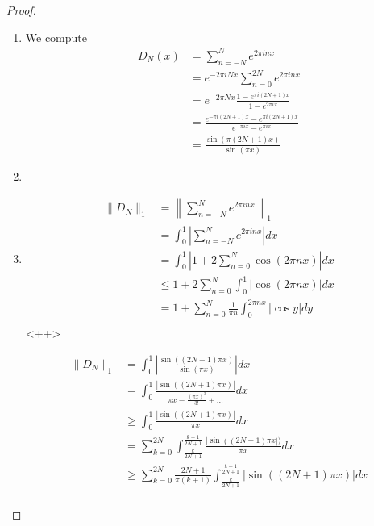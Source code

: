 \documentclass[a4paper]{article}
\begin{document}
\begin{enumerate}
\begin{proof}
  \begin{enumerate}
    \item
      We compute
      \begin{align*}
        D_N(x) &= \sum_{n=-N}^N e^{2 \pi i n x} \\
        &= e^{-2 \pi i N x} \sum_{n=0}^{2N} e^{2 \pi i n x} \\
        &= e^{-2 \pi N x} \frac{1 - e^{\pi i (2N+1)x}}{1 - e^{2 \pi i x}} \\
        &= \frac{e^{-\pi i (2N+1)x} - e^{\pi i (2N+1) x}}{ e^{-\pi i x} - e^{ \pi i x}} \\
        &= \frac{\sin \left( \pi (2N+1)x \right)}{\sin \left( \pi x \right)}
      \end{align*}

    \item

    \item
      \begin{align*}
        \| D_N \|_1 &= \left\| \sum_{n = -N}^N e^{2 \pi i n x} \right\|_1 \\
        &= \int_{0}^{1} \left| \sum_{n=-N}^N e^{2 \pi i n x} \right| dx \\
        &= \int_{0}^{1} \left| 1 + 2 \sum_{n = 0}^N \cos( 2 \pi n x) \right| dx \\
        &\leq 1 + 2 \sum_{n = 0}^N \int_{0}^{1} \left| \cos(2 \pi n x) \right| dx \\
        &= 1 + \sum_{n=0}^N \frac{1}{\pi n} \int_{0}^{2 \pi n x} | \cos y | dy \\
      \end{align*}<++>

      \begin{align*}
        \| D_N \|_1 &= \int_{0}^{1} \left| \frac{\sin \left( (2N+1) \pi x \right)}{\sin (\pi x)} \right| dx \\
        &= \int_{0}^{1} \frac{ | \sin \left( ( 2N+1 ) \pi x \right) |}{ \pi x - \frac{(\pi x)^3}{3!} + \dots} dx \\
        &\geq \int_{0}^{1} \frac{| \sin \left( ( 2N+1 ) \pi x \right) |}{\pi x} dx \\
        &= \sum_{k=0}^{2N} \int_{\frac{k}{2N+1}}^{\frac{k+1}{2N+1}} \frac{| \sin \left( ( 2N+1 ) \pi x \right |)}{\pi x} dx \\
        &\geq \sum_{k = 0}^{2N} \frac{2N+1}{\pi (k+1)} \int_{\frac{k}{2N+1}}^{\frac{k+1}{2N+1}} | \sin \left( (2N+1) \pi x \right) | dx \\
      \end{align*}


\end{enumerate}
\end{proof}
\end{enumerate}
\end{document}
